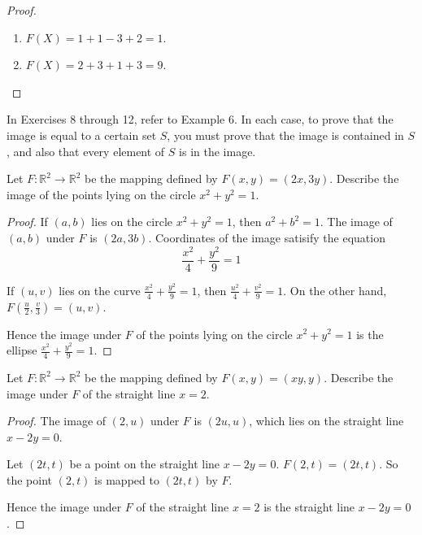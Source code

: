 \begin{proof}
    \begin{enumerate}[label={(\alph*)}]
        \item $F(X) = 1 + 1 - 3 + 2 = 1$.
        \item $F(X) = 2 + 3 + 1 + 3 = 9$.
    \end{enumerate}
\end{proof}

In Exercises 8 through 12, refer to Example 6. In each case, to prove that the image is equal to a certain set $S$, you must prove that the image is contained in $S$, and also that every element of $S$ is in the image.

\begin{exercise}
    Let $F: \mathbb{R}^{2} \to \mathbb{R}^{2}$ be the mapping defined by $F(x, y) = (2x, 3y)$. Describe the image of the points lying on the circle $x^{2} + y^{2} = 1$.
\end{exercise}

\begin{proof}
    If $(a, b)$ lies on the circle $x^{2} + y^{2} = 1$, then $a^{2} + b^{2} = 1$. The image of $(a, b)$ under $F$ is $(2a, 3b)$. Coordinates of the image satisify the equation
    \[
        \frac{x^{2}}{4} + \frac{y^{2}}{9} = 1
    \]

    If $(u, v)$ lies on the curve $\frac{x^{2}}{4} + \frac{y^{2}}{9} = 1$, then $\frac{u^{2}}{4} + \frac{v^{2}}{9} = 1$. On the other hand, $F(\frac{u}{2}, \frac{v}{3}) = (u, v)$.

    Hence the image under $F$ of the points lying on the circle $x^{2} + y^{2} = 1$ is the ellipse $\frac{x^{2}}{4} + \frac{y^{2}}{9} = 1$.
\end{proof}

\begin{exercise}
    Let $F: \mathbb{R}^{2} \to \mathbb{R}^{2}$ be the mapping defined by $F(x, y) = (xy, y)$. Describe the image under $F$ of the straight line $x = 2$.
\end{exercise}

\begin{proof}
    The image of $(2, u)$ under $F$ is $(2u, u)$, which lies on the straight line $x - 2y = 0$.

    Let $(2t, t)$ be a point on the straight line $x - 2y = 0$. $F(2, t) = (2t, t)$. So the point $(2, t)$ is mapped to $(2t, t)$ by $F$.

    Hence the image under $F$ of the straight line $x = 2$ is the straight line $x - 2y = 0$.
\end{proof}

